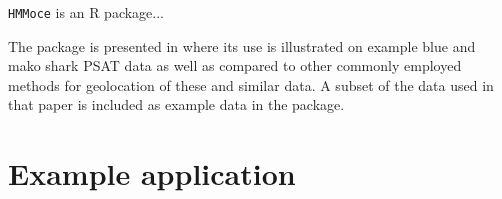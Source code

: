 \documentclass{article}\usepackage[]{graphicx}\usepackage[]{color}
\begin{document}
\texttt{HMMoce} is an R package...%


The package is presented in %
where its use is illustrated on example blue and mako shark PSAT data as well as compared to other commonly employed methods for geolocation of these and similar data. A subset of the data used in that paper is included as example data in the package.


\section{Example application} \label{sec:application}

\end{document}
